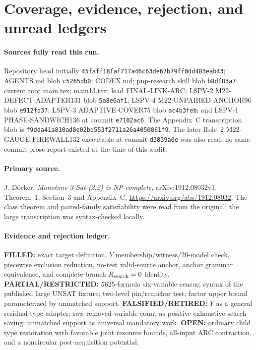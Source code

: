 \documentclass[11pt]{article}
\begin{document}
\section{Coverage, evidence, rejection, and unread ledgers}
\paragraph{Sources fully read this run.}
Repository head initially \texttt{45faff18faf717a46c63de67b79ff0dd483eab43};
AGENTS.md blob \texttt{c5265db0}; CODEX.md; pnp-research skill blob
\texttt{b8df83a7}; current root main.tex; main13.tex; lead FINAL-LINK-ARC;
LSPV-2 M22-DEFECT-ADAPTER131 blob \texttt{5a8e6af1}; LSPV-4
M22-UNPAIRED-ANCHOR96 blob \texttt{e912fd37}; LSPV-3 ADAPTIVE-COVER75 blob
\texttt{ac4b3feb}; and LSPV-1 PHASE-SANDWICH136 at commit
\texttt{e7102ac6}.  The Appendix~C transcription blob is
\texttt{f9dda41a810ad8e02bd553f2711a26a4050861f9}.
The later Role~2 M22-GAUGE-FIREWALL132 executable at commit
\texttt{d3839a0e} was also read; no same-commit prose report existed at the
time of this audit.

\paragraph{Primary source.}
J. Döcker, \emph{Monotone 3-Sat-(2,2) is NP-complete}, arXiv:1912.08032v1,
Theorem~1, Section~3 and Appendix~C,
\url{https://arxiv.org/abs/1912.08032}.  The class theorem and paired-family
satisfiability were read from the original; the large transcription was
syntax-checked locally.

\paragraph{Evidence and rejection ledger.}
\textbf{FILLED:} exact target definition, $Y$ membership/witness/20-model
check, piecewise exclusion reduction, no-test valid-source anchor, anchor
grammar equivalence, and complete-branch $R_{\rm search}=0$ identity.
\textbf{PARTIAL/RESTRICTED:} 5625-formula six-variable census; syntax of the
published large UNSAT fixture; two-level pin/reanchor test; factor upper bound
parameterized by unmatched support.  \textbf{FALSIFIED/RETIRED:} $Y$ as a
general residual-type adapter; raw removed-variable count as positive exhaustive
search saving; unmatched support as universal mandatory work.  \textbf{OPEN:}
ordinary child type restoration with favorable joint resource bounds,
all-input ARC contraction, and a noncircular post-acquisition potential.
\end{document}
